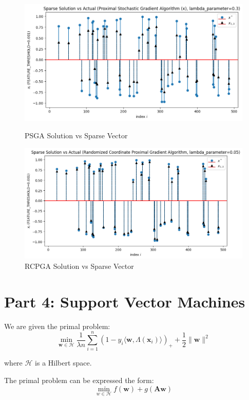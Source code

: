 \documentclass[12pt]{article}
\begin{document}
\begin{figure}[h]
\centering
\begin{minipage}{.5\textwidth}
  \centering
\includegraphics[scale=0.35]{outputs/part_3/psga-x}
\caption{PSGA Solution vs Sparse Vector}
\label{fig:}
\end{minipage}%
\begin{minipage}{.5\textwidth}
  \centering
\includegraphics[scale=0.35]{outputs/part_3/rcpga-x}
\caption{RCPGA Solution vs Sparse Vector}
\label{fig:}
\end{minipage}
\end{figure}


\newpage
\section*{Part 4: Support Vector Machines}

We are given the primal problem:
\[\min_{\textbf{w} \in \mathcal{H}} \frac{1}{\lambda n} \sum_{i=1}^{n} (1-y_i \langle \textbf{w}, \Lambda(\textbf{x}_i)\rangle)_{+} + \frac{1}{2}\| \textbf{w}\|^2\]

where $\mathcal{H}$ is a Hilbert space.

The primal problem can be expressed the form:
\[\min_{w \in \mathcal{H}} f(\textbf{w}) + g(\textbf{A}\textbf{w})\]
\end{document}
